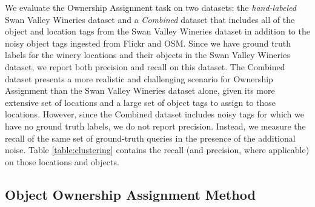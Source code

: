 We evaluate the Ownership Assignment task on two datasets: the \textit{hand-labeled} Swan Valley Wineries dataset and a \textit{Combined} dataset that includes all of the object and location tags from the Swan Valley Wineries dataset in addition to the noisy object tags ingested from Flickr and OSM.
Since we have ground truth labels for the winery locations and their objects in the Swan Valley Wineries dataset, we report both precision and recall on this dataset.
The Combined dataset presents a more realistic and challenging scenario for Ownership Assignment than the Swan Valley Wineries dataset alone, given its more extensive set of locations and a large set of object tags to assign to those locations. 
However, since the Combined dataset includes noisy tags for which we have no ground truth labels, we do not report precision. 
Instead, we measure the recall of the same set of ground-truth queries in the presence of the additional noise. 
%
Table \ref{table:clustering} contains the recall (and precision, where applicable) on those locations and objects.

\subsection{Object Ownership Assignment Method}

